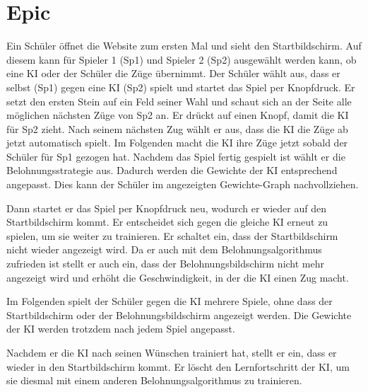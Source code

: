\documentclass[titlepage]{scrartcl}
\begin{document}
\section{Epic}

Ein Schüler öffnet die Website zum ersten Mal und sieht den Startbildschirm.
Auf diesem kann für Spieler 1 (Sp1) und Spieler 2 (Sp2) ausgewählt werden kann, ob eine KI oder der Schüler die Züge übernimmt.
Der Schüler wählt aus, dass er selbst (Sp1) gegen eine KI (Sp2) spielt und startet das Spiel per Knopfdruck.
Er setzt den ersten Stein auf ein Feld seiner Wahl und schaut sich an der Seite alle möglichen nächsten Züge von Sp2 an.
Er drückt auf einen Knopf, damit die KI für Sp2 zieht.
Nach seinem nächsten Zug wählt er aus, dass die KI die Züge ab jetzt automatisch spielt.
Im Folgenden macht die KI ihre Züge jetzt sobald der Schüler für Sp1 gezogen hat.
Nachdem das Spiel fertig gespielt ist wählt er die Belohnungsstrategie aus.
Dadurch werden die Gewichte der KI entsprechend angepasst.
Dies kann der Schüler im angezeigten Gewichte-Graph nachvollziehen.

Dann startet er das Spiel per Knopfdruck neu, wodurch er wieder auf den Startbildschirm kommt.
Er entscheidet sich gegen die gleiche KI erneut zu spielen, um sie weiter zu trainieren.
Er schaltet ein, dass der Startbildschirm nicht wieder angezeigt wird.
Da er auch mit dem Belohnungsalgorithmus zufrieden ist stellt er auch ein, dass der Belohnungsbildschirm nicht mehr angezeigt wird und erhöht die Geschwindigkeit, in der die KI einen Zug macht.

Im Folgenden spielt der Schüler gegen die KI mehrere Spiele, ohne dass der Startbildschirm oder der Belohnungsbildschirm angezeigt werden.
Die Gewichte der KI werden trotzdem nach jedem Spiel angepasst.

Nachdem er die KI nach seinen Wünschen trainiert hat, stellt er ein, dass er wieder in den Startbildschirm kommt.
Er löscht den Lernfortschritt der KI, um sie diesmal mit einem anderen Belohnungsalgorithmus zu trainieren.
\end{document}
